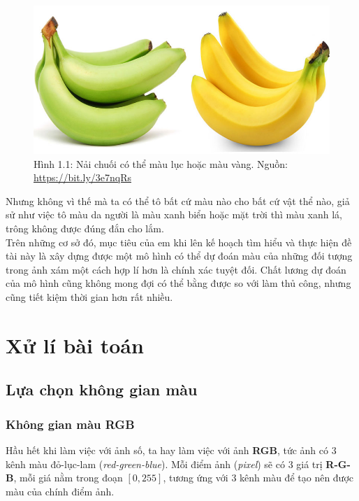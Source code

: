\documentclass[a4paper]{article}
\begin{document}
\begin{figure}[h!]
\centering
\includegraphics[width=15cm]{images/1_1.jpg}
\caption{Hình 1.1: Nải chuối có thể màu lục hoặc màu vàng. Nguồn: \href{https://bit.ly/3e7nqRs}{https://bit.ly/3e7nqRs}}
\end{figure}

\noindent
Nhưng không vì thế mà ta có thể tô bất cứ màu nào cho bất cứ vật thể nào, giả sử như việc tô màu da người là màu xanh biển hoặc mặt trời thì màu xanh lá, trông không được đúng đắn cho lắm.\\
Trên những cơ sở đó, mục tiêu của em khi lên kế hoạch tìm hiểu và thực hiện đề tài này là xây dựng được một mô hình có thể dự đoán màu của những đối tượng trong ảnh xám một cách hợp lí hơn là chính xác tuyệt đối. Chất lương dự đoán của mô hình cũng không mong đợi có thể bằng được so với làm thủ công, nhưng cũng tiết kiệm thời gian hơn rất nhiều.

\section{Xử lí bài toán}

\subsection{Lựa chọn không gian màu}

\subsubsection{Không gian màu RGB}
Hầu hết khi làm việc với ảnh số, ta hay làm việc với ảnh \textbf{RGB}, tức ảnh có 3 kênh màu đỏ-lục-lam (\textit{red-green-blue}). Mỗi điểm ảnh (\textit{pixel}) sẽ có 3 giá trị \textbf{R-G-B}, mỗi giá nằm trong đoạn $[0, 255]$, tương ứng với 3 kênh màu để tạo nên được màu của chính điểm ảnh.
\end{document}
